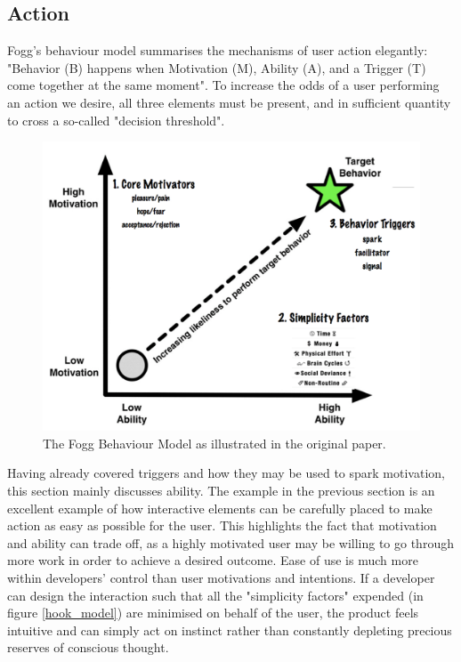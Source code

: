 \subsection{Action}
Fogg's behaviour model \cite{fogg2009behavior} summarises the mechanisms of user action elegantly: "Behavior (B) happens when Motivation (M), Ability (A), and a Trigger (T) come together at the same moment". To increase the odds of a user performing an action we desire, all three elements must be present, and in sufficient quantity to cross a so-called "decision threshold".

\begin{figure}[h]
    \begin{center}
        \includegraphics[scale=0.3]{images/fogg_behaviour.png}
    \end{center}
    \caption{The Fogg Behaviour Model as illustrated in the original paper.}
    \label{fig:fogg_behaviour}
\end{figure}

Having already covered triggers and how they may be used to spark motivation, this section mainly discusses ability. The example in the previous section is an excellent example of how interactive elements can be carefully placed to make action as easy as possible for the user. This highlights the fact that motivation and ability can trade off, as a highly motivated user may be willing to go through more work in order to achieve a desired outcome. Ease of use is much more within developers' control than user motivations and intentions. If a developer can design the interaction such that all the "simplicity factors" expended (in figure \ref{hook_model}) are minimised on behalf of the user, the product feels intuitive and can simply act on instinct rather than constantly depleting precious reserves of conscious thought.

